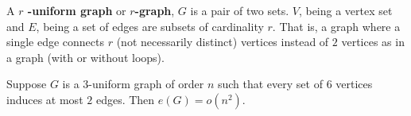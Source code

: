 \begin{definition}[Hypergraphs]
	A \textbf{\(r\) -uniform graph} or \textbf{\(r\)-graph}, \(G\) is a pair of two sets. \(V\), being a vertex set and \(E\), being a set of edges are subsets of cardinality \(r\). That is, a graph where a single edge connects \(r\) (not necessarily distinct) vertices instead of \(2\) vertices as in a graph (with or without loops).
\end{definition}
\begin{proposition}
	Suppose \(G\) is a \(3\)-uniform graph of order \(n\) such that every set of \(6\) vertices induces at most \(2\) edges. Then \(e\left( G \right)  = o\left( n^2 \right) \).
\end{proposition}
